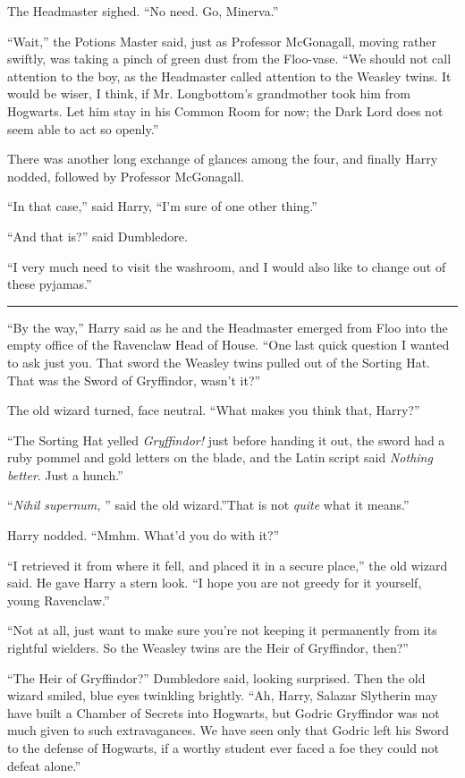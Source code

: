 The Headmaster sighed. ``No need. Go, Minerva.''

``Wait,'' the Potions Master said, just as Professor McGonagall, moving
rather swiftly, was taking a pinch of green dust from the Floo-vase.
``We should not call attention to the boy, as the Headmaster called
attention to the Weasley twins. It would be wiser, I think, if Mr.
Longbottom's grandmother took him from Hogwarts. Let him stay in his
Common Room for now; the Dark Lord does not seem able to act so
openly.''

There was another long exchange of glances among the four, and finally
Harry nodded, followed by Professor McGonagall.

``In that case,'' said Harry, ``I'm sure of one other thing.''

``And that is?'' said Dumbledore.

``I very much need to visit the washroom, and I would also like to
change out of these pyjamas.''

\begin{center}\rule{3in}{0.4pt}\end{center}

``By the way,'' Harry said as he and the Headmaster emerged from Floo
into the empty office of the Ravenclaw Head of House. ``One last quick
question I wanted to ask just you. That sword the Weasley twins pulled
out of the Sorting Hat. That was the Sword of Gryffindor, wasn't it?''

The old wizard turned, face neutral. ``What makes you think that,
Harry?''

``The Sorting Hat yelled \emph{Gryffindor!} just before handing it out,
the sword had a ruby pommel and gold letters on the blade, and the Latin
script said \emph{Nothing better}. Just a hunch.''

``\emph{Nihil supernum,} '' said the old wizard.''That is not \emph{quite}
what it means.''

Harry nodded. ``Mmhm. What'd you do with it?''

``I retrieved it from where it fell, and placed it in a secure place,''
the old wizard said. He gave Harry a stern look. ``I hope you are not
greedy for it yourself, young Ravenclaw.''

``Not at all, just want to make sure you're not keeping it permanently
from its rightful wielders. So the Weasley twins are the Heir of
Gryffindor, then?''

``The Heir of Gryffindor?'' Dumbledore said, looking surprised. Then the
old wizard smiled, blue eyes twinkling brightly. ``Ah, Harry, Salazar
Slytherin may have built a Chamber of Secrets into Hogwarts, but Godric
Gryffindor was not much given to such extravagances. We have seen only
that Godric left his Sword to the defense of Hogwarts, if a worthy
student ever faced a foe they could not defeat alone.''

